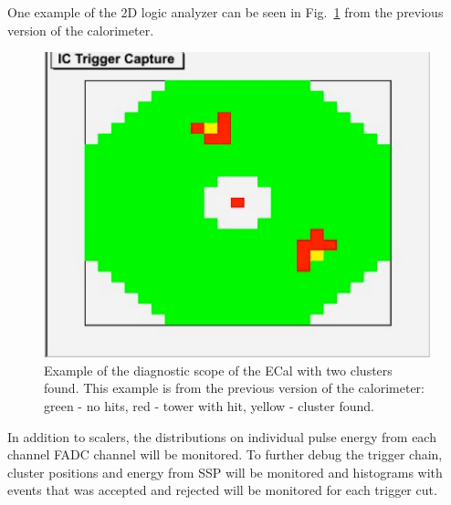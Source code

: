 One example of the 2D logic analyzer can be seen in Fig.~\ref{fig:dvcs_2_cluster} from the previous version of the calorimeter.
\begin{figure}[]
\includegraphics[scale=0.8]{daq_trigger/figures/dvcs_2_cluster}
\caption{\small{Example of the diagnostic scope of the ECal with two clusters found. This example is from the previous version of the calorimeter: green - no hits, red - tower with hit, yellow - cluster found.}}
\label{fig:dvcs_2_cluster}
\end{figure}
In addition to scalers, the distributions on individual pulse energy from each channel FADC channel will be monitored. 
To further debug the trigger chain, cluster positions and energy from SSP will be monitored and histograms with events that was accepted and rejected will be monitored for each trigger cut. 










